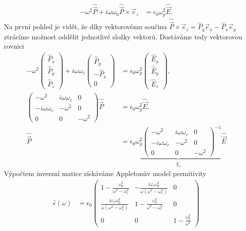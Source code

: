 \documentclass[11pt,a4paper]{article}
\begin{document}
        \begin{align}
            -\omega^2 \hat{\vec P} + i\omega\omega_0 \hat{\vec P} \times \vec e_z &= \epsilon_0 \omega_p^2 \hat{\vec E}.
        \end{align}
        Na první pohled je vidět, že díky vektorovému součinu $\hat{\vec P} \times \vec e_z = \hat P_y \vec e_x - \hat P_x \vec e_y$ ztrácíme možnost oddělit jednotlivé složky vektorů. Dostáváme tedy vektorovou rovnici
        \begin{align*}
            -\omega^2 \begin{pmatrix}
                \hat P_x \\ \hat P_y \\ \hat P_z
            \end{pmatrix} + i\omega \omega_c \begin{pmatrix}
                \hat P_y \\ -\hat P_x \\ 0
            \end{pmatrix} &= \epsilon_0 \omega_p^2 \begin{pmatrix}
                \hat E_x \\ \hat E_y \\ \hat E_z
            \end{pmatrix},
        \\
            \begin{pmatrix}
                -\omega^2 & i \omega \omega_c  & 0
            \\
                -i\omega \omega_c & -\omega^2 & 0
            \\
                0 & 0 & -\omega^2
            \end{pmatrix} \hat{\vec P} &= \epsilon_0 \omega_p^2 \hat{\vec E},
        \\
            \hat{\vec P} &= \epsilon_0 \underbrace{\omega_p^2 \begin{pmatrix}
                -\omega^2 & i \omega \omega_c  & 0
            \\
                -i\omega \omega_c & -\omega^2 & 0
            \\
                0 & 0 & -\omega^2
            \end{pmatrix}^{-1}}_{\hat\chi_e} \hat{\vec E}
        \end{align*}
        Výpočtem inverzní matice získáváme Appletonův model permitivity
        \begin{align}
            \hat\epsilon(\omega) &= \epsilon_0 \begin{pmatrix}
                1- \frac{\omega_p^2}{\omega^2 - \omega_c^2} & -\frac{i \omega_c \omega_p^2}{\omega(\omega^2-\omega_c^2)} & 0
            \\
                \frac{i \omega_c \omega_p^2}{\omega(\omega^2-\omega_c^2)} & 1- \frac{\omega_p^2}{\omega^2 - \omega_c^2} & 0
            \\
                0 & 0 & 1- \frac{\omega_p^2}{\omega^2}
            \end{pmatrix}
        \end{align}
\end{document}
